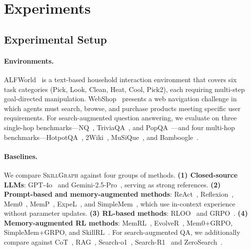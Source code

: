 
\section{Experiments}
\label{sec:experiments}
\subsection{Experimental Setup}


\paragraph{Environments.}
ALFWorld~\citep{shridhar2020alfworld} is a text-based household interaction environment that covers six task categories (Pick, Look, Clean, Heat, Cool, Pick2), each requiring multi-step goal-directed manipulation. WebShop~\citep{yao2022webshop} presents a web navigation challenge in which agents must search, browse, and purchase products meeting specific user requirements. For search-augmented question answering, we evaluate on three single-hop benchmarks---NQ~\citep{kwiatkowski2019nq}, TriviaQA~\citep{joshi2017triviaqa}, and PopQA~\citep{mallen2023popqa}---and four multi-hop benchmarks---HotpotQA~\citep{yang2018hotpotqa}, 2Wiki~\citep{ho2020twowiki}, MuSiQue~\citep{trivedi2022musique}, and Bamboogle~\citep{press2023bamboogle}.

\paragraph{Baselines.}
We compare \textsc{SkillGraph} against four groups of methods. \textbf{(1) Closed-source LLMs}: GPT-4o~\citep{openai2024gpt4o} and Gemini-2.5-Pro~\citep{comanici2025gemini}, serving as strong references. \textbf{(2) Prompt-based and memory-augmented methods}: ReAct~\citep{yao2022react}, Reflexion~\citep{shinn2023reflexion}, Mem0~\citep{chhikara2025mem0}, MemP~\citep{fang2025memp}, ExpeL~\citep{zhao2024expel}, and SimpleMem~\citep{liu2025simplemem}, which use in-context experience without parameter updates. \textbf{(3) RL-based methods}: RLOO~\citep{ahmadian2024rloo} and GRPO~\citep{shao2024deepseekmath}. \textbf{(4) Memory-augmented RL methods}: MemRL~\citep{zhang2026memrl}, EvolveR~\citep{wu2025evolver}, Mem0+GRPO, SimpleMem+GRPO, and SkillRL~\citep{xia2025skillrl}. For search-augmented QA, we additionally compare against CoT~\citep{wei2022chain}, RAG~\citep{arslan2024survey}, Search-o1~\citep{li2025searcho1}, Search-R1~\citep{jin2025searchr1} and ZeroSearch~\citep{sun2025zerosearch}.

